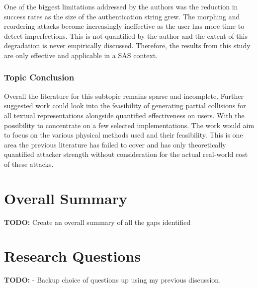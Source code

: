 One of the biggest limitations addressed by the authors 
was the reduction in success rates as the size of the 
authentication string grew. The morphing and reordering 
attacks become increasingly ineffective as the user has 
more time to detect imperfections. This is not quantified by 
the author and the extent of this degradation is never 
empirically discussed. Therefore, the results from this 
study are only effective and applicable in a SAS context.



\subsubsection{Topic Conclusion}
Overall the literature for this subtopic remains sparse and incomplete. Further suggested work could look into the feasibility of generating partial collisions for all textual representations alongside quantified effectiveness on users. With the possibility to concentrate on a few selected implementations. The work would aim to focus on the various physical methods used and their feasibility. This is one area the previous literature has failed to cover and has only theoretically quantified attacker strength without consideration for the actual real-world cost of these attacks.

\section{Overall Summary}
\textbf{TODO: } Create an overall summary of all the gaps identified

\section{Research Questions}
\textbf{TODO: } - Backup choice of questions up using my previous discussion.